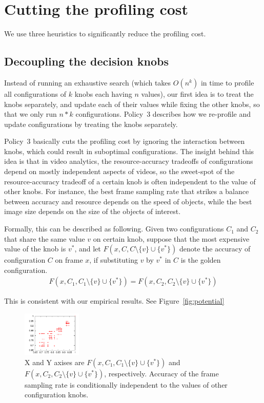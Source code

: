 \section{Cutting the profiling cost}

We use three heuristics to significantly reduce the profiling cost.


\subsection{Decoupling the decision knobs}
Instead of running an exhaustive search (which takes $O(n^k)$ 
in time to profile all configurations of $k$ knobs each having $n$ values), 
our first idea is to treat the knobs separately, and update each of their values 
while fixing the other knobs, so that we only run $n*k$ configurations. 
Policy~3 describes how we re-profile and update configurations by treating the
knobs separately. 

Policy~3 basically cuts the profiling cost by ignoring the interaction between knobs,
which could result in suboptimal configurations.
The insight behind this idea is that in video analytics, 
the resource-accuracy tradeoffs of configurations depend on mostly independent
aspects of videos, so the sweet-spot of the resource-accuracy tradeoff of a certain
knob is often independent to the value of other knobs.
For instance, the best frame sampling rate that strikes a balance between accuracy 
and resource depends on the speed of objects, while the best image size depends
on the size of the objects of interest. 

Formally, this can be described as following. 
Given two configurations $C_1$ and $C_2$ that share the same value $v$ 
on certain knob, suppose that the most expensive value of the knob is $v^*$, and
let $F(x,C,C\setminus\{v\}\cup \{v^*\})$ denote 
the accuracy of configuration $C$ 
on frame $x$, if substituting $v$ by $v^*$ in $C$ is the golden configuration.
\begin{align*}
    F(x,C_1,C_1\setminus\{v\}\cup \{v^*\})=
    F(x,C_2,C_2\setminus\{v\}\cup \{v^*\})
\end{align*}

This is consistent with our empirical results.
See Figure~\ref{fig:potential}

\begin{figure}
    \centering
    \includegraphics[width=0.25\textwidth]{figures/Profile_Sampling.pdf}
    \caption{X and Y axises are $F(x,C_1,C_1\setminus\{v\}\cup \{v^*\})$ and $F(x,C_2,C_2\setminus\{v\}\cup \{v^*\})$, respectively. Accuracy of the frame sampling rate is conditionally independent to 
    the values of other configuration knobs.}
    \label{fig:}
\end{figure}

